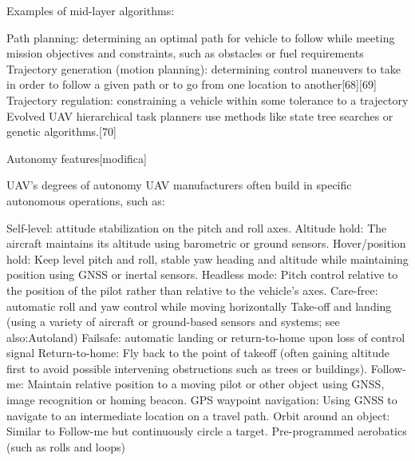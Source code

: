 Examples of mid-layer algorithms:

Path planning: determining an optimal path for vehicle to follow while meeting mission objectives and constraints, such as obstacles or fuel requirements
Trajectory generation (motion planning): determining control maneuvers to take in order to follow a given path or to go from one location to another[68][69]
Trajectory regulation: constraining a vehicle within some tolerance to a trajectory
Evolved UAV hierarchical task planners use methods like state tree searches or genetic algorithms.[70]

Autonomy features[modifica]

UAV's degrees of autonomy
UAV manufacturers often build in specific autonomous operations, such as:

Self-level: attitude stabilization on the pitch and roll axes.
Altitude hold: The aircraft maintains its altitude using barometric or ground sensors.
Hover/position hold: Keep level pitch and roll, stable yaw heading and altitude while maintaining position using GNSS or inertal sensors.
Headless mode: Pitch control relative to the position of the pilot rather than relative to the vehicle's axes.
Care-free: automatic roll and yaw control while moving horizontally
Take-off and landing (using a variety of aircraft or ground-based sensors and systems; see also:Autoland)
Failsafe: automatic landing or return-to-home upon loss of control signal
Return-to-home: Fly back to the point of takeoff (often gaining altitude first to avoid possible intervening obstructions such as trees or buildings).
Follow-me: Maintain relative position to a moving pilot or other object using GNSS, image recognition or homing beacon.
GPS waypoint navigation: Using GNSS to navigate to an intermediate location on a travel path.
Orbit around an object: Similar to Follow-me but continuously circle a target.
Pre-programmed aerobatics (such as rolls and loops)